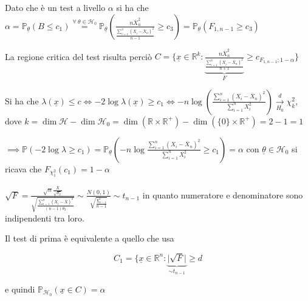 \documentclass[hidelinks, 10pt]{report}
\begin{document}
\begin{es}


Dato che \`e un test a livello $ \alpha $ si ha che $ \alpha = \mathbb{P}_{\underline{\theta}} (B \le c_{1}) \stackrel{\forall\ \theta \in \mathcal{H}_{0}}{=} \mathbb{P}_{\underline{\theta}} \left( \frac{n \overline{X}_{n}^{2}}{\frac{\sum\limits_{i = 1}^{n} (X_{i} - \overline{X}_{n})^{2}}{n - 1}} \ge c_{3} \right) = \mathbb{P}_{\underline{\theta}} (F_{1, n - 1} \ge c_{3}) $

La regione critica del test risulta perci\`o $ C = \{ \underline{x} \in \mathbb{R}^{k} : \underbrace{\frac{n \overline{X}_{n}^{2}}{\frac{\sum\limits_{i = 1}^{n} (X_{i} - \overline{X}_{n})^{2}}{n + 1}}}_{F} \ge c_{F_{1, n - 1}; 1 - \alpha} \} $

Si ha che $ \lambda (\underline{x}) \le c \iff -2 \log \lambda (\underline{x}) \ge c_{1} \iff - n \log \left( \frac{\sum\limits_{i = 1}^{n} (X_{i} - \overline{X}_{n})^{2}}{\sum\limits_{i = 1}^{n} X_{i}^{2}} \right) \mathop{\to}\limits_{H_{0}}^{d} \chi^{2}_{k} $, dove $ k = \dim \mathcal{H} - \dim \mathcal{H}_{0} = \dim (\mathbb{R} \times \mathbb{R}^{+}) - \dim (\{ 0 \} \times \mathbb{R}^{+}) = 2 - 1 = 1 $

$ \implies \mathbb{P} (-2 \log \lambda \ge c_{1})  = \mathbb{P}_{\underline{\theta}} \left( -n \log \frac{\sum\limits_{i = 1}^{n} (X_{i} - \overline{X}_{n})^{2}}{\sum\limits_{i = 1}^{n} X_{i}^{2}} \ge c_{1} \right) = \alpha $ con $ \underline{\theta} \in \mathcal{H}_{0} $ si ricava che $ F_{\chi^{2}_{1}} (c_{1}) = 1 - \alpha $


$ \sqrt{F} = \frac{\sqrt{n} \frac{\overline{X}}{\sqrt{\theta_{2}}}}{\sqrt{\frac{\sum\limits_{i = 1}^{n} (X_{i} - \overline{X})^{2}}{(n - 1) \theta_{2}}}} \sim \frac{N(0, 1)}{\sqrt{\frac{\chi^{2}_{n - 1}}{n - 1}}} \sim t_{n - 1} $ in quanto numeratore e denominatore sono indipendenti tra loro.

Il test di prima \`e equivalente a quello che usa

\[ C_{1} = \{ \underline{x} \in \mathbb{R}^{n} : \underbrace{\vert \sqrt{F} \vert}_{\sim t_{n - 1}} \ge d \]

e quindi $ \mathbb{P}_{\mathcal{H}_{0}} (\underline{x} \in C) = \alpha $

\end{es}
\end{document}
